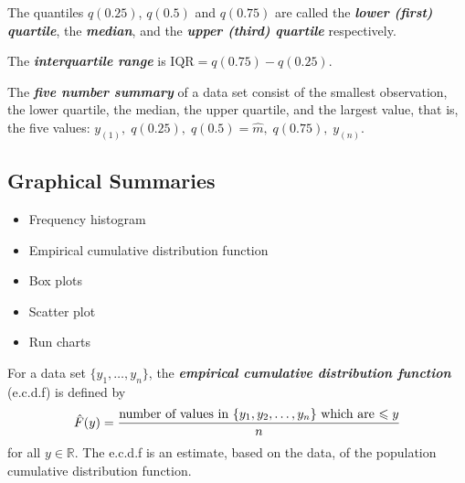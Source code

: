 \begin{defbox}
    \begin{definition}
        The quantiles $ q(0.25) $, $ q(0.5) $ and $ q(0.75) $ are called the
        \textbf{\emph{lower (first) quartile}}, the \textbf{\emph{median}},
        and the \textbf{\emph{upper (third) quartile}} respectively.
    \end{definition}
\end{defbox}

\begin{defbox}
    \begin{definition}
        The \textbf{\emph{interquartile range}} is $ \text{IQR}=q(0.75)-q(0.25) $.
    \end{definition}
\end{defbox}

\begin{defbox}
    \begin{definition}
        The \textbf{\emph{five number summary}} of a data set consist of the smallest observation,
        the lower quartile, the median, the upper quartile, and the largest value, that is,
        the five values: $ y_{(1)},\;q(0.25),\;q(0.5)=\hat{m},\;q(0.75),\;y_{(n)} $.
    \end{definition}
\end{defbox}

\subsection{Graphical Summaries}

\begin{itemize}
    \item Frequency histogram
    \item Empirical cumulative distribution function
    \item Box plots
    \item Scatter plot
    \item Run charts
\end{itemize}
\begin{defbox}
    \begin{definition}
        For a data set $ \{y_1,\ldots ,y_n\} $, the \textbf{\emph{empirical cumulative distribution function}}
        (e.c.d.f) is defined by
        \[ \hat{F}(y)=\frac{\text{number of values in $ \{y_1,y_2,\ldots ,y_n\} $ which are $ \leqslant y $}}{n} \]
        for all $ y\in\mathbb{R} $.
        The e.c.d.f is an estimate, based on the data, of the population cumulative distribution function.
    \end{definition}
\end{defbox}
